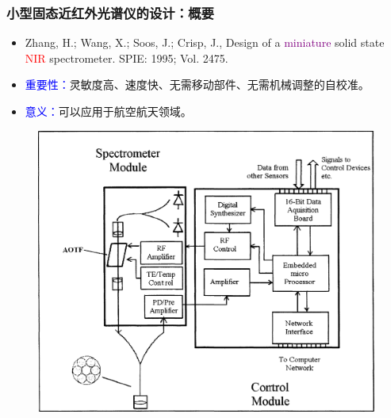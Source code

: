 \begin{frame}[c]
    \frametitle{小型固态近红外光谱仪的设计：概要}
    \begin{itemize}
        \item Zhang, H.;  Wang, X.;  Soos, J.; Crisp, J., Design of a \textcolor{purple}{miniature} solid state \textcolor{red}{NIR} spectrometer. SPIE: 1995; Vol. 2475.
        \item \textcolor{blue}{重要性：}灵敏度高、速度快、无需移动部件、无需机械调整的自校准。
        \item \textcolor{blue}{意义：}可以应用于航空航天领域。
    \end{itemize}
    \begin{figure}[H] %
        \centering %
        \includegraphics[width=.8\textwidth]{figures/Design of a miniature solid state NIR spectrometer_1.png} %
    \end{figure}
\end{frame}

